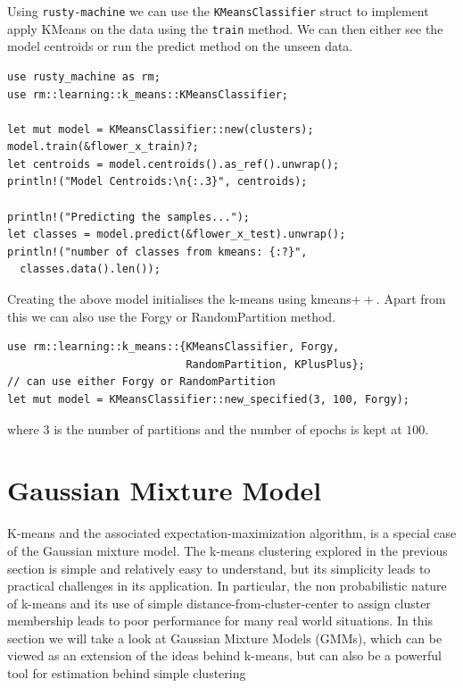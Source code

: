 \documentclass{book}
\begin{document}
Using \lstinline{rusty-machine} we can use the \lstinline{KMeansClassifier} struct to implement apply KMeans on the data using the \lstinline{train} method. We can then either see the model centroids or run the predict method on the unseen data.

\begin{lstlisting}[caption={rusty\_machine\_unsupervised},basicstyle=\small]
use rusty_machine as rm;
use rm::learning::k_means::KMeansClassifier;

let mut model = KMeansClassifier::new(clusters);
model.train(&flower_x_train)?;
let centroids = model.centroids().as_ref().unwrap();
println!("Model Centroids:\n{:.3}", centroids);

println!("Predicting the samples...");
let classes = model.predict(&flower_x_test).unwrap();
println!("number of classes from kmeans: {:?}",
  classes.data().len());
\end{lstlisting}

Creating the above model initialises the k-means using kmeans$++$. Apart from this we can also use the Forgy or RandomPartition method.

\begin{lstlisting}[caption={rusty\_machine\_unsupervised},basicstyle=\small]
use rm::learning::k_means::{KMeansClassifier, Forgy,
                            RandomPartition, KPlusPlus};
// can use either Forgy or RandomPartition
let mut model = KMeansClassifier::new_specified(3, 100, Forgy);
\end{lstlisting}

where $3$ is the number of partitions and the number of epochs is kept at $100$.

\label{sec:kmeans_clustering}
\section{Gaussian Mixture Model}%
K-means and the associated expectation-maximization algorithm, is a special case of the Gaussian mixture model. The k-means clustering explored in the previous section is simple and relatively easy to understand, but its simplicity leads to practical challenges in its application. In particular, the non probabilistic nature of k-means and its use of simple distance-from-cluster-center to assign cluster membership leads to poor performance for many real world situations. In this section we will take a look at Gaussian Mixture Models (GMMs), which can be viewed as an extension of the ideas behind k-means, but can also be a powerful tool for estimation behind simple clustering \cite{UL:7} 
\end{document}
